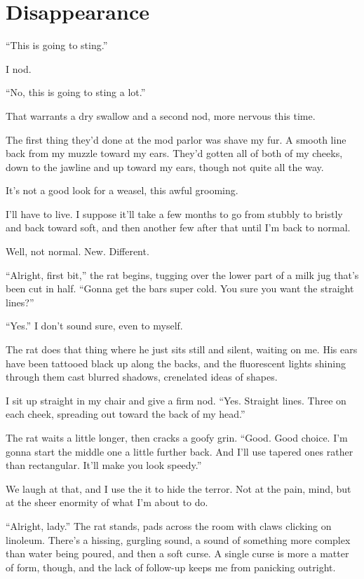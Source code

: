 \hypertarget{disappearance}{%
\chapter{Disappearance}\label{disappearance}}

``This is going to sting.''

I nod.

``No, this is going to sting a lot.''

That warrants a dry swallow and a second nod, more nervous this time.

The first thing they'd done at the mod parlor was shave my fur. A smooth line back from my muzzle toward my ears. They'd gotten all of both of my cheeks, down to the jawline and up toward my ears, though not quite all the way.

It's not a good look for a weasel, this awful grooming.

I'll have to live. I suppose it'll take a few months to go from stubbly to bristly and back toward soft, and then another few after that until I'm back to normal.

Well, not normal. New. Different.

``Alright, first bit,'' the rat begins, tugging over the lower part of a milk jug that's been cut in half. ``Gonna get the bars super cold. You sure you want the straight lines?''

``Yes.'' I don't sound sure, even to myself.

The rat does that thing where he just sits still and silent, waiting on me. His ears have been tattooed black up along the backs, and the fluorescent lights shining through them cast blurred shadows, crenelated ideas of shapes.

I sit up straight in my chair and give a firm nod. ``Yes. Straight lines. Three on each cheek, spreading out toward the back of my head.''

The rat waits a little longer, then cracks a goofy grin. ``Good. Good choice. I'm gonna start the middle one a little further back. And I'll use tapered ones rather than rectangular. It'll make you look speedy.''

We laugh at that, and I use the it to hide the terror. Not at the pain, mind, but at the sheer enormity of what I'm about to do.

``Alright, lady.'' The rat stands, pads across the room with claws clicking on linoleum. There's a hissing, gurgling sound, a sound of something more complex than water being poured, and then a soft curse. A single curse is more a matter of form, though, and the lack of follow-up keeps me from panicking outright.

